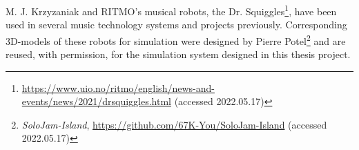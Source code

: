 



M. J. Krzyzaniak and RITMO's musical robots, the Dr. Squiggles\footnote{\url{https://www.uio.no/ritmo/english/news-and-events/news/2021/drsquiggles.html} (accessed 2022.05.17)}, have been used in several music technology systems and projects previously. Corresponding 3D-models of these robots for simulation were designed by Pierre Potel\footnote{\textit{SoloJam-Island}, \url{https://github.com/67K-You/SoloJam-Island} (accessed 2022.05.17)} and are reused, with permission, for the simulation system designed in this thesis project.


